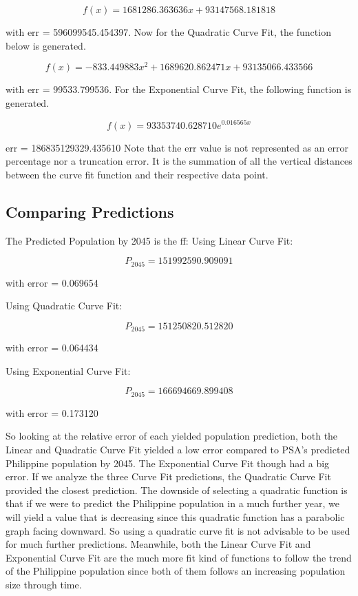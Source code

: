 \documentclass{acm_proc_article-sp}
\begin{document}
\begin{equation}
f(x) = 1681286.363636x + 93147568.181818
\end{equation}

with err = 596099545.454397.
Now for the Quadratic Curve Fit, the function below is generated.

\begin{equation}
f(x) = -833.449883x^2 + 1689620.862471x + 93135066.433566
\end{equation}

with err = 99533.799536.
For the Exponential Curve Fit, the following function is generated.

\begin{equation}
f(x) = 93353740.628710e^{0.016565x}
\end{equation}

err = 186835129329.435610
Note that the err value is not represented as an error percentage nor a truncation error. It is the summation of all the vertical distances between the curve fit function and their respective data point.

\subsection{Comparing Predictions}
The Predicted Population by 2045 is the ff:
Using Linear Curve Fit:

\begin{equation}
P_{2045} = 151992590.909091
\end{equation}

with error = 0.069654

Using Quadratic Curve Fit:

\begin{equation}
P_{2045} = 151250820.512820
\end{equation}

with error = 0.064434

Using Exponential Curve Fit:

\begin{equation}
P_{2045} = 166694669.899408
\end{equation}

with error = 0.173120

So looking at the relative error of each yielded population prediction, both the Linear and Quadratic Curve Fit yielded a low error compared to PSA's predicted Philippine population by 2045. The Exponential Curve Fit though had a big error. If we analyze the three Curve Fit predictions, the Quadratic Curve Fit provided the closest prediction. The downside of selecting a quadratic function is that if we were to predict the Philippine population in a much further year, we will yield a value that is decreasing since this quadratic function has a parabolic graph facing downward. So using a quadratic curve fit is not advisable to be used for much further predictions. Meanwhile, both the Linear Curve Fit and Exponential Curve Fit are the much more fit kind of functions to follow the trend of the Philippine population since both of them follows an increasing population size through time.
\end{document}
